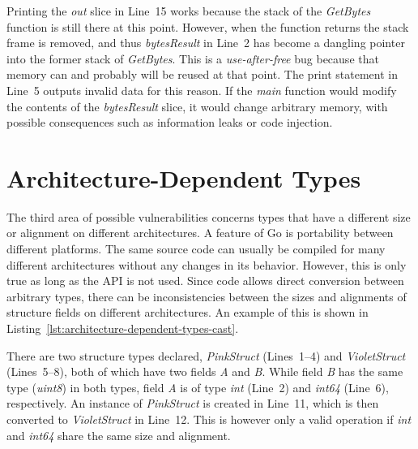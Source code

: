Printing the \textit{out} slice in Line~15 works because the stack of the \textit{GetBytes} function is still there at
this point.
However, when the function returns the stack frame is removed, and thus \textit{bytesResult} in Line~2 has become a
dangling pointer into the former stack of \textit{GetBytes}.
This is a \textit{use-after-free} bug because that memory can and probably will be reused at that point.
The print statement in Line~5 outputs invalid data for this reason.
If the \textit{main} function would modify the contents of the \textit{bytesResult} slice, it would change arbitrary
memory, with possible consequences such as information leaks or code injection.

\begin{insight}
\end{insight}



\section{Architecture-Dependent Types}\label{sec:unsafe-security-problems:architecture-dependent-types}

The third area of possible vulnerabilities concerns types that have a different size or alignment on different
architectures.
A feature of Go is portability between different platforms.
The same source code can usually be compiled for many different architectures without any changes in its behavior.
However, this is only true as long as the \unsafe{} \acrshort{API} is not used.
Since \unsafe{} code allows direct conversion between arbitrary types, there can be inconsistencies between the sizes
and alignments of structure fields on different architectures.
An example of this is shown in Listing~\ref{lst:architecture-dependent-types-cast}.



There are two structure types declared, \textit{PinkStruct} (Lines~1--4) and \textit{VioletStruct} (Lines~5--8), both of
which have two fields \textit{A} and \textit{B}.
While field \textit{B} has the same type (\textit{uint8}) in both types, field \textit{A} is of type \textit{int}
(Line~2) and \textit{int64} (Line~6), respectively.
An instance of \textit{PinkStruct} is created in Line~11, which is then converted to \textit{VioletStruct} in Line~12.
This is however only a valid operation if \textit{int} and \textit{int64} share the same size and alignment.

